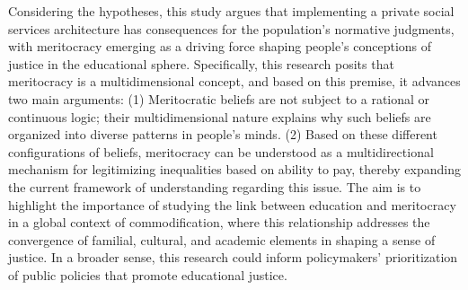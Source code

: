 \documentclass[
  spanish,
  a4paper,
  oneside]{scrbook}
\begin{document}
Considering the hypotheses, this study argues that implementing a
private social services architecture has consequences for the
population's normative judgments, with meritocracy emerging as a driving
force shaping people's conceptions of justice in the educational sphere.
Specifically, this research posits that meritocracy is a
multidimensional concept, and based on this premise, it advances two
main arguments: (1) Meritocratic beliefs are not subject to a rational
or continuous logic; their multidimensional nature explains why such
beliefs are organized into diverse patterns in people's minds. (2) Based
on these different configurations of beliefs, meritocracy can be
understood as a multidirectional mechanism for legitimizing inequalities
based on ability to pay, thereby expanding the current framework of
understanding regarding this issue. The aim is to highlight the
importance of studying the link between education and meritocracy in a
global context of commodification, where this relationship addresses the
convergence of familial, cultural, and academic elements in shaping a
sense of justice. In a broader sense, this research could inform
policymakers' prioritization of public policies that promote educational
justice.
\end{document}
